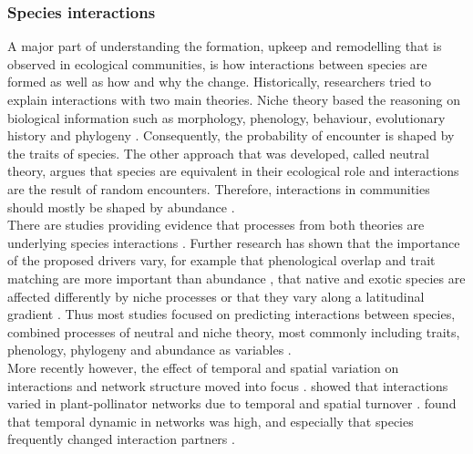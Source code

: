 \documentclass[12pt,a4paper]{article}
\begin{document}

\subsubsection{Species interactions}
A major part of understanding the formation, upkeep and remodelling that is observed in ecological communities, is how interactions between species are formed as well as how and why the change. Historically, researchers tried to explain interactions with two main theories. Niche theory based the reasoning on biological information such as morphology, phenology, behaviour, evolutionary history and phylogeny \parencite{Webb2002, Jordano2003, Vazquez2009}. %
Consequently, the probability of encounter is shaped by the traits of species.
The other approach that was developed, called neutral theory, argues that species are equivalent in their ecological role and interactions are the result of random encounters. Therefore, interactions in communities should mostly be shaped by abundance \parencite{Vazquez2005, Vazquez2007}.\\
There are studies providing evidence that processes from both theories are underlying species interactions \parencite{Vazquez2009a, Verdu2011}. Further research has shown that the importance of the proposed drivers vary, for example that phenological overlap and trait matching are more important than abundance \parencite{Vizentin-Bugoni2014}, that native and exotic species are affected differently by niche processes \parencite{Peralta2020} or that they vary along a latitudinal gradient \parencite{Sonne2020}. Thus most studies focused on predicting interactions between species, combined processes of neutral and niche theory, most commonly including traits, phenology, phylogeny and abundance as variables \parencite{Pearse2013, Olito2015, Morente-Lopez2018, Kotula2021, Benadi2022}.\\
More recently however, the effect of temporal and spatial variation on interactions and network structure moved into focus \parencite{Schwarz2020, CaraDonna2021}. \citeauthor{Olesen2008} showed that interactions varied in plant-pollinator networks due to temporal and spatial turnover \parencite{Olesen2008}. \citeauthor{CaraDonna2017} found that temporal dynamic in networks was high, and especially that species frequently changed interaction partners \parencite{CaraDonna2017}. \par
\end{document}
